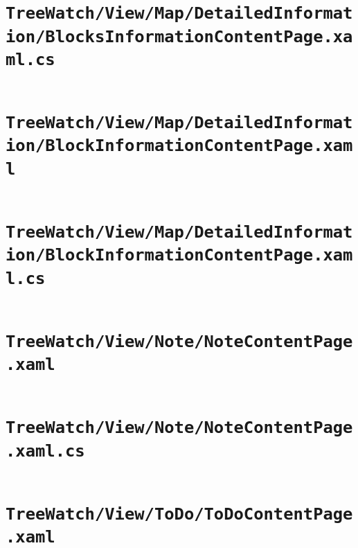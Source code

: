 \documentclass[12pt]{article}
\begin{document}
\section[\texttt{TreeWatch/View/Map/…/BlocksInformationContentPage.xaml.cs}]
{\texttt{TreeWatch/View/Map/DetailedInformation/\linebreak BlocksInformationContentPage.xaml.cs}}
	\inputminted[linenos,firstline=22]{csharp}{../../../src/TreeWatch/View/Map/DetailedInformation/BlocksInformationContentPage.xaml.cs}
	\pagebreak

\section[\texttt{TreeWatch/View/Map/…/BlockInformationContentPage.xaml}]
{\texttt{TreeWatch/View/Map/DetailedInformation/\linebreak BlockInformationContentPage.xaml}}
	\inputminted[linenos]{xml}{../../../src//TreeWatch/View/Map/DetailedInformation/BlockInformationContentPage.xaml}
	\pagebreak

\section[\texttt{TreeWatch/View/Map/…/BlockInformationContentPage.xaml.cs}]
{\texttt{TreeWatch/View/Map/DetailedInformation/\linebreak BlockInformationContentPage.xaml.cs}}
	\inputminted[linenos,firstline=22]{csharp}{../../../src/TreeWatch/View/Map/DetailedInformation/BlockInformationContentPage.xaml.cs}
	\pagebreak

\section{\texttt{TreeWatch/View/Note/NoteContentPage.xaml}}
	\inputminted[linenos]{xml}{../../../src/TreeWatch/View/Note/NoteContentPage.xaml}
	\pagebreak

\section{\texttt{TreeWatch/View/Note/NoteContentPage.xaml.cs}}
	\inputminted[linenos,firstline=22]{csharp}{../../../src/TreeWatch/View/Note/NoteContentPage.xaml.cs}
	\pagebreak

\section{\texttt{TreeWatch/View/ToDo/ToDoContentPage.xaml}}
	\inputminted[linenos]{xml}{../../../src/TreeWatch/View/ToDo/ToDoContentPage.xaml}
	\pagebreak
\end{document}
